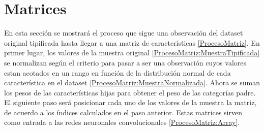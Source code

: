 \section{Matrices}

  En esta sección se mostrará el proceso que sigue una observación del dataset original tipificada hasta llegar a una matriz de características \eqref{ProcesoMatriz}. En primer lugar, los valores de la muestra original \eqref{ProcesoMatriz:MuestraTipificada} se normalizan según el criterio  para pasar a ser una observación cuyos valores estan acotados en un rango en función de la distribución normal de cada característica en el dataset \eqref{ProcesoMatriz:MuestraNormalizada}. Ahora se suman los pesos de las características hijas para obtener el peso de las categorías padre. El siguiente paso será posicionar cada uno de los valores de la muestra la matriz, de acuerdo a los índices calculados en el paso anterior. Estas matrices sirven como entrada a las redes neuronales convolucionales \eqref{ProcesoMatriz:Array}.

